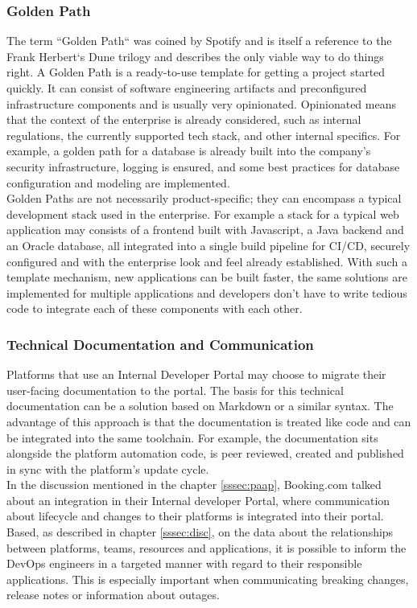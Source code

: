 \documentclass[a4paper,12pt]{article}
\begin{document}
    \subsubsection{Golden Path}
    \label{sssec:goldenpath}
    The term ``Golden Path`` was coined by Spotify\parencite{spotifygoldenpath} and is itself a reference to the Frank
    Herbert`s Dune trilogy and describes the only viable way to do things right.
    A Golden Path is a ready-to-use template for getting a project started quickly.
    It can consist of software engineering artifacts and preconfigured infrastructure components and is usually very
    opinionated.
    Opinionated means that the context of the enterprise is already considered, such as internal regulations,
    the currently supported tech stack, and other internal specifics.
    For example, a golden path for a database is already built into the company's security infrastructure,
    logging is ensured, and some best practices for database configuration and modeling are implemented.\\
    Golden Paths are not necessarily product-specific; they can encompass a typical development stack used in the enterprise.
    For example a stack for a typical web application may consists of a frontend built with Javascript, a Java backend
    and an Oracle database, all integrated into a single build pipeline for CI/CD,
    securely configured and with the enterprise look and feel already established.
    With such a template mechanism, new applications can be built faster, the same solutions are implemented for multiple
    applications and developers don't have to write tedious code to integrate each of these components with each other.

    \subsubsection{Technical Documentation and Communication}
    \label{sssec:techdoc}
    Platforms that use an Internal Developer Portal may choose to migrate their user-facing documentation to the portal.
    The basis for this technical documentation can be a solution based on Markdown\parencite{backstagetechdocs}
    or a similar syntax.
    The advantage of this approach is that the documentation is treated like code and can be integrated into the same toolchain.
    For example, the documentation sits alongside the platform automation code, is peer reviewed, created
    and published in sync with the platform's update cycle.\\
    In the discussion mentioned in the chapter \ref{sssec:paap}, Booking.com talked about an integration in their Internal
    developer Portal, where communication about lifecycle and changes to their platforms is integrated into their portal.
    Based, as described in chapter \ref{sssec:disc}, on the data about the relationships between platforms, teams,
    resources and applications, it is possible to inform the DevOps engineers in a targeted manner with regard to their
    responsible applications.
    This is especially important when communicating breaking changes, release notes or information about outages.
\end{document}

